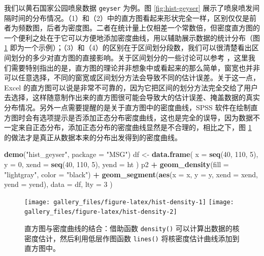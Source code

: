 \documentclass[
  b5paper,
  UTF8,twoside]{book}
\newenvironment{Shaded}{\begin{snugshade}}{\end{snugshade}}
\newcommand{\AttributeTok}[1]{\textcolor[rgb]{0.13,0.29,0.53}{#1}}
\newcommand{\DecValTok}[1]{\textcolor[rgb]{0.00,0.00,0.81}{#1}}
\newcommand{\FunctionTok}[1]{\textcolor[rgb]{0.13,0.29,0.53}{\textbf{#1}}}
\newcommand{\NormalTok}[1]{#1}
\newcommand{\OtherTok}[1]{\textcolor[rgb]{0.56,0.35,0.01}{#1}}
\newcommand{\SpecialCharTok}[1]{\textcolor[rgb]{0.81,0.36,0.00}{\textbf{#1}}}
\newcommand{\StringTok}[1]{\textcolor[rgb]{0.31,0.60,0.02}{#1}}
\begin{document}
我们以黄石国家公园喷泉数据 \texttt{geyser} \citep{Venables02} 为例。图 \ref{fig:hist-geyser} 展示了喷泉喷发间隔时间的分布情况。（1）和（2）中的直方图看起来形状完全一样，区别仅仅是前者为频数图，后者为密度图。二者在统计量上仅相差一个常数倍，但密度直方图的一个便利之处在于它可以方便地添加密度曲线，用以辅助展示数据的统计分布（图 \ref{fig:hist-density} 即为一个示例）；（3）和（4）的区别在于区间划分段数，我们可以很清楚看出区间划分的多少对直方图的直接影响。关于区间划分的一些讨论可以参考 \citet{Venables02}，这里我们需要特别指出的是，直方图的理论并非想象中或看起来的那么简单，窗宽也并非可以任意选择，不同的窗宽或区间划分方法会导致不同的估计误差。关于这一点，Excel 的直方图可以说是非常不可靠的，因为它把区间的划分方法完全交给了用户去选择，这样随意制作出来的直方图很可能会导致大的估计误差、掩盖数据的真实分布情况。另外一点需要提醒的是关于直方图中的密度曲线，SPSS 软件在绘制直方图时会有选项提示是否添加正态分布密度曲线，这也是完全的误导，因为数据不一定来自正态分布，添加正态分布的密度曲线显然是不合理的，相比之下，图 \ref{fig:hist-density} 的做法才是真正从数据本来的分布出发得到的密度曲线。





\begin{Shaded}
\begin{Highlighting}[]
\FunctionTok{demo}\NormalTok{(}\StringTok{"hist\_geyser"}\NormalTok{, }\AttributeTok{package =} \StringTok{"MSG"}\NormalTok{)}
\NormalTok{df }\OtherTok{\textless{}{-}} \FunctionTok{data.frame}\NormalTok{(}
  \AttributeTok{x =} \FunctionTok{seq}\NormalTok{(}\DecValTok{40}\NormalTok{, }\DecValTok{110}\NormalTok{, }\DecValTok{5}\NormalTok{), }\AttributeTok{y =} \DecValTok{0}\NormalTok{,}
  \AttributeTok{xend =} \FunctionTok{seq}\NormalTok{(}\DecValTok{40}\NormalTok{, }\DecValTok{110}\NormalTok{, }\DecValTok{5}\NormalTok{), }\AttributeTok{yend =}\NormalTok{ ht}
\NormalTok{)}
\NormalTok{p2 }\SpecialCharTok{+} \FunctionTok{geom\_density}\NormalTok{(}\AttributeTok{fill =} \StringTok{"lightgray"}\NormalTok{, }\AttributeTok{color =} \StringTok{"black"}\NormalTok{) }\SpecialCharTok{+}
  \FunctionTok{geom\_segment}\NormalTok{(}\FunctionTok{aes}\NormalTok{(}\AttributeTok{x =}\NormalTok{ x, }\AttributeTok{y =}\NormalTok{ y, }\AttributeTok{xend =}\NormalTok{ xend, }\AttributeTok{yend =}\NormalTok{ yend),}
    \AttributeTok{data =}\NormalTok{ df, }\AttributeTok{lty =} \DecValTok{3}
\NormalTok{  )}
\end{Highlighting}
\end{Shaded}

\begin{figure}

{\centering \texttt{[image: gallery\_files/figure-latex/hist-density-1]} \texttt{[image: gallery\_files/figure-latex/hist-density-2]} 

}

\caption[直方图与密度曲线的结合]{直方图与密度曲线的结合：借助函数 \texttt{density()} 可以计算出数据的核密度估计，然后利用低层作图函数 \texttt{lines()} 将核密度估计曲线添加到直方图中。}\label{fig:hist-density}
\end{figure}
\end{document}
